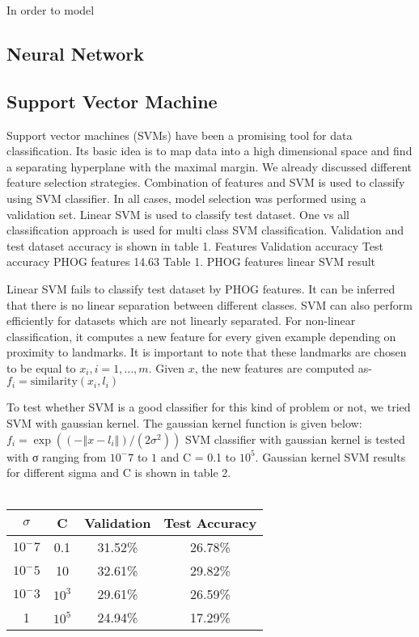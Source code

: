 \documentclass[10pt,twocolumn]{article}
\begin{document}
In order to model 
\subsection{Neural Network}
\subsection{Support Vector Machine}
Support vector machines (SVMs) have been a promising tool for data classification. Its basic idea is to map data into a high dimensional space and find a separating hyperplane with the maximal margin.
We already discussed different feature selection strategies. \cite {chen2006combining} Combination of features and SVM is used to classify using SVM classifier. In all cases, model selection was performed using a validation set. Linear SVM is used to classify test dataset. One vs all classification approach is used for multi class SVM classification. Validation and test dataset accuracy is shown in table 1.
Features	Validation accuracy	Test accuracy
PHOG features	14.63%
Table 1. PHOG features linear SVM result

Linear SVM fails to classify test dataset by PHOG features. It can be inferred that there is no linear separation between different classes.
SVM can also perform efficiently for datasets which are not linearly separated. For non-linear classification, it computes a new feature for every given example depending on proximity to landmarks. It is important to note that these landmarks are chosen to be equal to $x_i, i=1,…,m$. Given $x$, the new features are computed as-
$f_i=\text{similarity}(x_i,l_i)$
 
To test whether SVM is a good classifier for this kind of problem or not, we tried SVM with gaussian kernel. The gaussian kernel function is given below:
$f_i=\exp⁡((-‖x-l_i ‖)/(2σ^2 ))$
\cite {larochelle2007empirical} SVM classifier with gaussian kernel is tested with σ ranging from $10^-7$ to $1$ and C = 0.1 to $10^5$. Gaussian kernel SVM results for different sigma and C is shown in table 2.
\\
\\
\begin{tabular}{|c|c|c|c|}
\hline
$\sigma$ & C &	Validation & Test Accuracy \\ \hline
$10^-7$  & 0.1	& 31.52\%	& 26.78\% \\
$10^-5$	 & 10	& 32.61\%	& 29.82\% \\
$10^-3$	 & $10^3$ & 29.61\%	& 26.59\% \\
1        &$10^5$ & 	24.94\% & 	17.29\% \\
\hline
\end{tabular}
\\
\end{document}
